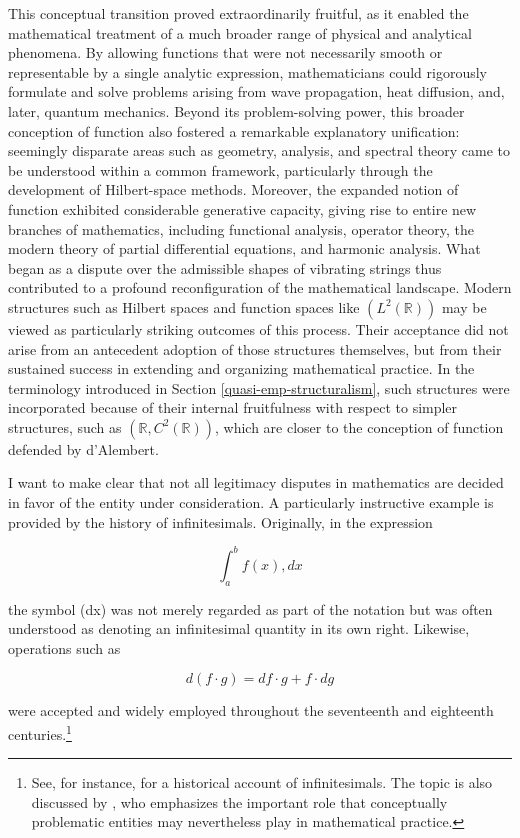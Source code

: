 \documentclass[11pt,a4paper]{book}
\theoremstyle{plain}
\begin{document}
This conceptual transition proved extraordinarily fruitful, as it enabled the mathematical treatment of a much broader range of physical and analytical phenomena. By allowing functions that were not necessarily smooth or representable by a single analytic expression, mathematicians could rigorously formulate and solve problems arising from wave propagation, heat diffusion, and, later, quantum mechanics. Beyond its problem-solving power, this broader conception of function also fostered a remarkable explanatory unification: seemingly disparate areas such as geometry, analysis, and spectral theory came to be understood within a common framework, particularly through the development of Hilbert-space methods. Moreover, the expanded notion of function exhibited considerable generative capacity, giving rise to entire new branches of mathematics, including functional analysis, operator theory, the modern theory of partial differential equations, and harmonic analysis. What began as a dispute over the admissible shapes of vibrating strings thus contributed to a profound reconfiguration of the mathematical landscape. Modern structures such as Hilbert spaces and function spaces like $(L^2(\mathbb R))$ may be viewed as particularly striking outcomes of this process. Their acceptance did not arise from an antecedent adoption of those structures themselves, but from their sustained success in extending and organizing mathematical practice. In the terminology introduced in Section \ref{quasi-emp-structuralism}, such structures were incorporated because of their internal fruitfulness with respect to simpler structures, such as $(\mathbb R,C^2(\mathbb R))$, which are closer to the conception of function defended by d'Alembert.

I want to make clear that not all legitimacy disputes in mathematics are decided in favor of the entity under consideration. A particularly instructive example is provided by the history of infinitesimals. Originally, in the expression

$$\int_a^b f(x),dx$$

the symbol (dx) was not merely regarded as part of the notation but was often understood as denoting an infinitesimal quantity in its own right. Likewise, operations such as

$$d(f \cdot g)=df \cdot g + f \cdot dg$$

were accepted and widely employed throughout the seventeenth and eighteenth centuries.\footnote{See, for instance, \textcite{Bos1974} for a historical account of infinitesimals. The topic is also discussed by \textcite{Lakatos1976}, who emphasizes the important role that conceptually problematic entities may nevertheless play in mathematical practice. }
\end{document}
